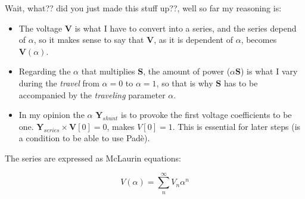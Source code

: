 \documentclass[11pt,fleqn]{book} %
\begin{document}
Wait, what?? did you just made this stuff up??, well so far my reasoning is:
\begin{itemize}
	\item The voltage $\textbf{V}$ is what I have to convert into a series, and the series depend of $\alpha$, so it makes sense to say that $\textbf{V}$, as it is dependent of $\alpha$, becomes $\textbf{V}(\alpha)$.
	
	\item Regarding the $\alpha$ that multiplies $\textbf{S}$, the amount of power ($\alpha \textbf{S}$) is what I vary during the \textit{travel} from $\alpha=0$ to $\alpha=1$, so that is why $\textbf{S}$ has to be accompanied by the \textit{traveling} parameter $\alpha.$
	
	\item In my opinion the $\alpha$ $\textbf{Y}_{shunt}$ is to provoke the first voltage coefficients to be one.  $\textbf{Y}_{series} \times \textbf{V}[0] = 0$, makes $V[0]=1$. This is essential for later steps (is a condition to be able to use Padè). \newline
\end{itemize}

The series are expressed as McLaurin equations:

\begin{equation}
V(\alpha) = \sum_{n}^{\infty} V_n \alpha ^n
\label{eq:McLaurinV}
\end{equation}
\end{document}
